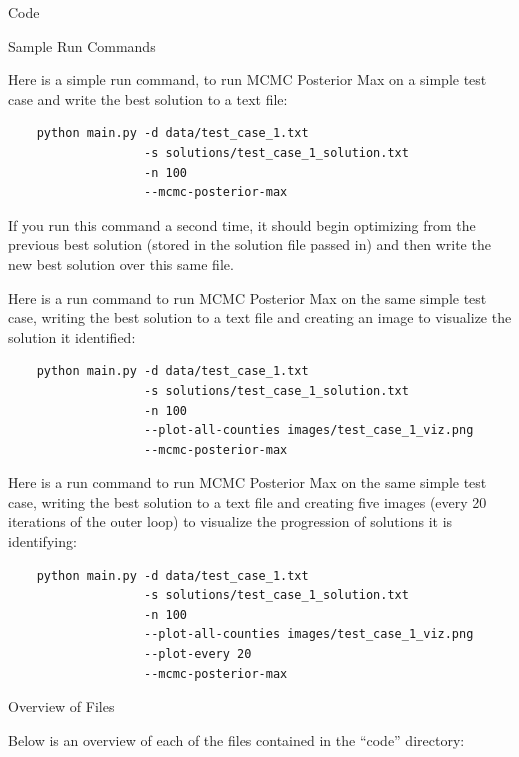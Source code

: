 \documentclass{article}
\newcommand{\noi}{\noindent}
\begin{document}
\begin{section}{Code}

\begin{subsection}{Sample Run Commands}

Here is a simple run command, to run MCMC Posterior Max on a simple test case and write the best solution to a text file:
\begin{verbatim}
    python main.py -d data/test_case_1.txt
                   -s solutions/test_case_1_solution.txt
                   -n 100
                   --mcmc-posterior-max
\end{verbatim}

\noi If you run this command a second time, it should begin optimizing from the previous best solution (stored in the solution file passed in) and then write the new best solution over this same file.

Here is a run command to run MCMC Posterior Max on the same simple test case, writing the best solution to a text file and creating an image to visualize the solution it identified:
\begin{verbatim}
    python main.py -d data/test_case_1.txt
                   -s solutions/test_case_1_solution.txt
                   -n 100
                   --plot-all-counties images/test_case_1_viz.png
                   --mcmc-posterior-max
\end{verbatim}

Here is a run command to run MCMC Posterior Max on the same simple test case, writing the best solution to a text file and creating five images (every 20 iterations of the outer loop) to visualize the progression of solutions it is identifying:
\begin{verbatim}
    python main.py -d data/test_case_1.txt
                   -s solutions/test_case_1_solution.txt
                   -n 100
                   --plot-all-counties images/test_case_1_viz.png
                   --plot-every 20
                   --mcmc-posterior-max
\end{verbatim}

\end{subsection}

\begin{subsection}{Overview of Files}

Below is an overview of each of the files contained in the ``code'' directory:


\end{subsection}
\end{section}
\end{document}

